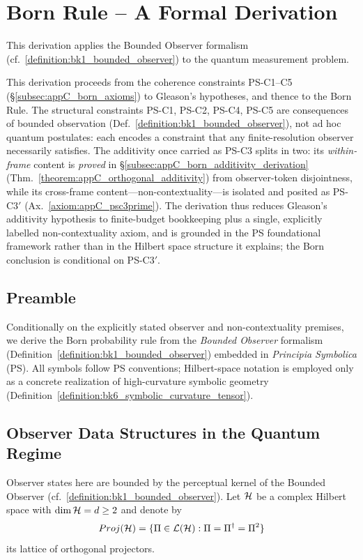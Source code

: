 \section{Born Rule – A Formal Derivation}
\label{sec:appC_born_rule}
This derivation applies the Bounded Observer formalism (cf.~\ref{definition:bk1_bounded_observer}) to the quantum measurement problem.

\begin{remark}
\label{remark:appC_born_rule_dependency}
This derivation proceeds from the coherence constraints PS-C1--C5
(\S\ref{subsec:appC_born_axioms}) to Gleason's hypotheses, and thence to
the Born Rule. The structural constraints PS-C1, PS-C2, PS-C4, PS-C5 are
consequences of bounded observation (Def.~\ref{definition:bk1_bounded_observer}),
not ad hoc quantum postulates: each encodes a constraint that any
finite-resolution observer necessarily satisfies. The additivity once carried as
PS-C3 splits in two: its \emph{within-frame} content is \emph{proved} in
\S\ref{subsec:appC_born_additivity_derivation}
(Thm.~\ref{theorem:appC_orthogonal_additivity}) from observer-token disjointness,
while its cross-frame content---non-contextuality---is isolated and posited as
PS-C3$'$ (Ax.~\ref{axiom:appC_psc3prime}). The derivation thus reduces Gleason's
additivity hypothesis to finite-budget bookkeeping plus a single, explicitly
labelled non-contextuality axiom, and is grounded in the PS foundational framework
rather than in the Hilbert space structure it explains; the Born conclusion is
conditional on PS-C3$'$.
\end{remark}

\subsection*{Preamble}
\label{sec:appC_born_preamble}
Conditionally on the explicitly stated observer and non-contextuality premises, we derive the Born probability rule from the
\emph{Bounded Observer} formalism (Definition~\ref{definition:bk1_bounded_observer})
embedded in \textit{Principia Symbolica} (PS).
All symbols follow PS conventions; Hilbert-space notation is employed
only as a concrete realization of high-curvature symbolic geometry
(Definition~\ref{definition:bk6_symbolic_curvature_tensor}).

\subsection{Observer Data Structures in the Quantum Regime}
\label{subsec:appC_born_observer_structures}
Observer states here are bounded by the perceptual kernel of the Bounded Observer (cf.~\ref{definition:bk1_bounded_observer}).
Let $\mathcal{H}$ be a complex Hilbert space with $\dim\mathcal{H} = d \ge 2$
and denote by
\[
Proj(\mathcal{H}) = \{\Pi\in\mathcal{L}(\mathcal{H}): \Pi = \Pi^\dagger = \Pi^2\}
\]
its lattice of orthogonal projectors.

